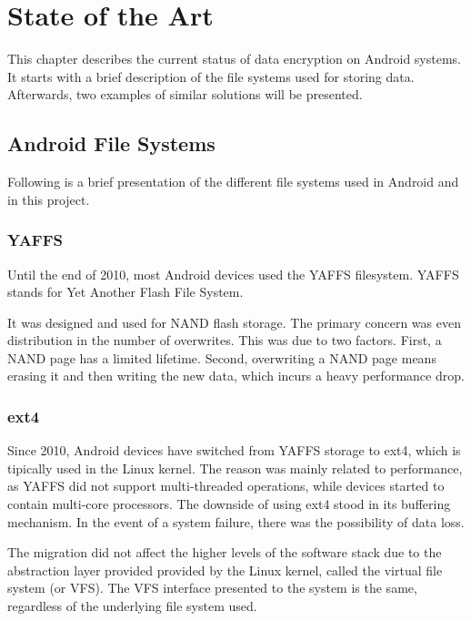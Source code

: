 \chapter{State of the Art}
\label{chapter:state}

This chapter describes the current status of data encryption on Android systems. It starts with a brief description of the file systems used for storing data. Afterwards, two examples of similar solutions will be presented.

\section{Android File Systems}
\label{sec:android-filesys}

Following is a brief presentation of the different file systems used in Android and in this project.

\subsection{YAFFS}
\label{sub-sec:yaffs}

Until the end of 2010, most Android devices used the YAFFS filesystem\cite{ext4}.
YAFFS stands for Yet Another Flash File System.

It was designed and used for NAND flash storage. The primary concern was even distribution in the number of overwrites. This was due to two factors. First, a NAND page has a limited lifetime. Second, overwriting a NAND page means erasing it and then writing the new data, which incurs a heavy performance drop.

\subsection{ext4}
\label{sub-sec:ext4}

Since 2010, Android devices have switched from YAFFS storage to ext4, which is tipically used in the Linux kernel. The reason was mainly related to performance, as YAFFS did not support multi-threaded operations, while devices started to contain multi-core processors\cite{ext4}.
The downside of using ext4 stood in its buffering mechanism. In the event of a system failure, there was the possibility of data loss.

The migration did not affect the higher levels of the software stack due to the abstraction layer provided provided by the Linux kernel, called the virtual file system (or VFS). The VFS interface presented to the system is the same, regardless of the underlying file system used.

